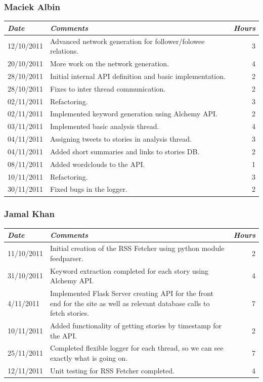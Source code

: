 \documentclass[a4paper,12pt]{article}
\begin{document}
	  \subsubsection{Maciek Albin}
	    \begin{tabular}{l | p{10cm} r}
	     \emph{\large Date} & \emph{\large Comments} & \emph{\large Hours}\\
	     \hline
	     12/10/2011 & Advanced network generation for follower/folowee relations. & 3\\
	     20/10/2011 & More work on the network generation. & 4\\
	     28/10/2011 & Initial internal API definition and basic implementation. & 2\\
	     28/10/2011 & Fixes to inter thread communication. & 2\\
	     02/11/2011 & Refactoring. & 3\\
	     02/11/2011 & Implemented keyword generation using Alchemy API. & 2\\
	     03/11/2011 & Implemented basic analysis thread. & 4\\
	     04/11/2011 & Assigning tweets to stories in analysis thread. & 3\\
	     04/11/2011 & Added short summaries and links to stories DB. & 2\\
	     08/11/2011 & Added wordclouds to the API. & 1\\
	     10/11/2011 & Refactoring. & 3\\
	     30/11/2011 & Fixed bugs in the logger. & 2
	    \end{tabular}
	    
	  \subsubsection{Jamal Khan}
	  \begin{tabular}{l | p{10cm} r}
     \emph{\large Date} & \emph{\large Comments} & \emph{\large Hours}\\
     \hline
	  11/10/2011 & Initial creation of the RSS Fetcher using python module feedparser. & 2\\
    31/10/2011 & Keyword extraction completed for each story using Alchemy API. & 4\\
    4/11/2011 & Implemented Flask Server creating API for the front end for the site as well as relevant database calls to fetch stories. & 7\\
    10/11/2011 & Added functionality of getting stories by timestamp for the API. & 2\\
    25/11/2011 & Completed flexible logger for each thread, so we can see exactly what is going on. & 7\\
    12/11/2011 & Unit testing for RSS Fetcher completed. & 4
  \end{tabular}
  
\end{document}
